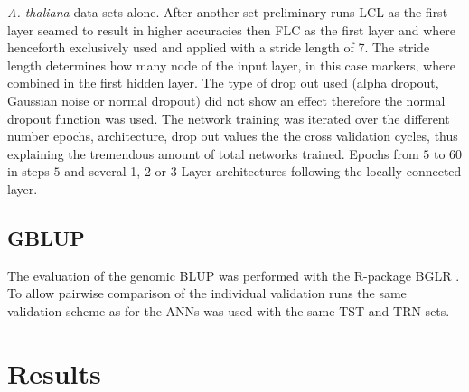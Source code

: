 \textit{A. thaliana} data sets alone. \newline After another set preliminary runs LCL as the first layer
seamed to result in higher accuracies then FLC as the first layer and where henceforth exclusively used and
applied with a stride length of 7. The stride length determines how many node of the input layer, in this case
markers, where combined in the first hidden layer.  The type of drop out used (alpha dropout, Gaussian noise
or normal dropout) did not show an effect therefore the normal dropout function was used.  The network
training was iterated over the different number epochs, architecture, drop out values the the cross validation
cycles, thus explaining the tremendous amount of total networks trained. Epochs from $5$ to $60$ in steps $5$
and several 1, 2 or 3 Layer architectures following the locally-connected layer.


 
 

\subsection{GBLUP}

The evaluation of the genomic BLUP was performed with the R-package BGLR \cite{BGLR}. To allow pairwise
comparison of the individual validation runs the same validation scheme as for the ANNs was used with the same
TST and TRN sets. 

\singlespacing
\section{Results} \label{res:gp}

